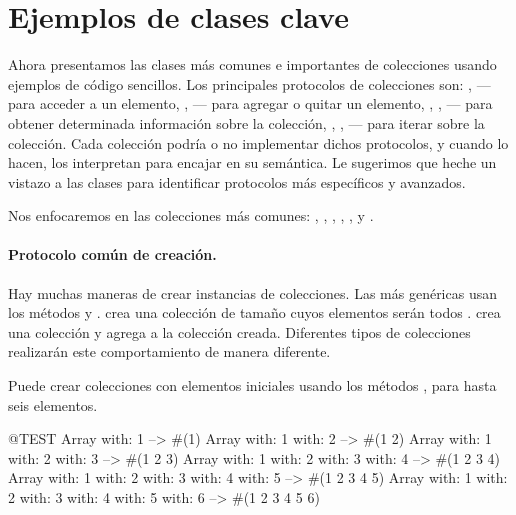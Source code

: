 \documentclass[a4paper,10pt,twoside]{book}
\begin{document}
\section{Ejemplos de clases clave}
Ahora presentamos las clases m\'as comunes e importantes de colecciones usando ejemplos de c\'odigo sencillos.
Los principales protocolos de colecciones son: ,  --- para acceder a un elemento, ,  --- para agregar o quitar un elemento, , ,  --- para obtener determinada informaci\'on sobre la colecci\'on, , ,  --- para iterar sobre  la colecci\'on. 
Cada colecci\'on podr\'ia o no implementar dichos protocolos, y cuando lo hacen, los interpretan para encajar en su sem\'antica. Le sugerimos que heche un vistazo a las clases para identificar protocolos m\'as espec\'ificos y avanzados.

Nos enfocaremos en las colecciones m\'as comunes: , , , , , y .

\paragraph{Protocolo com\'un de creaci\'on.}
Hay muchas maneras de crear instancias de colecciones. Las m\'as gen\'ericas usan los m\'etodos  y .  crea una colecci\'on de tama\~{n}o  cuyos elementos ser\'an todos .   crea una colecci\'on y agrega  a la colecci\'on creada. Diferentes tipos de colecciones realizar\'an este comportamiento de manera diferente.

Puede crear colecciones con elementos iniciales usando los m\'etodos ,  \etc para hasta seis elementos.

\begin{code}{@TEST}
Array with: 1 --> #(1)
Array with: 1 with: 2 --> #(1 2)
Array with: 1 with: 2 with: 3 --> #(1 2 3)
Array with: 1 with: 2 with: 3 with: 4 --> #(1 2 3 4)
Array with: 1 with: 2 with: 3 with: 4 with: 5 --> #(1 2 3 4 5)
Array with: 1 with: 2 with: 3 with: 4 with: 5 with: 6 --> #(1 2 3 4 5 6)
\end{code}
\end{document}
